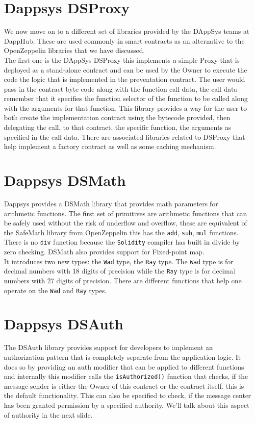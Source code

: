\section{Dappsys DSProxy}

We now move on to a different set of libraries provided by the DAppSys teams at DappHub. These are used commonly in smart contracts as an alternative to the OpenZeppelin libraries that we have discussed.\\

The first one is the DAppSys DSProxy this implements a simple Proxy that is deployed as a stand-alone contract and can be used by the Owner to execute the code the logic that is implemented in the preventation contract. The user would pass in the contract byte code along with the function call data, the call data remember that it specifies the function selector of the function to be called along with the arguments for that function. This library provides a way for the user to both create the implementation contract using the bytecode provided, then delegating the call, to that contract, the specific function, the arguments as specified in the call data. There are associated libraries related to DSProxy that help implement a factory contract as well as some caching mechanism.

\section{Dappsys DSMath}
Dappsys provides a DSMath library that provides math parameters for arithmetic functions. The first set of primitives are arithmetic functions that can be safely used without the risk of underflow and overflow, these are equivalent of the SafeMath library from OpenZeppelin this has the \verb|add|, \verb|sub|, \verb|mul| functions. There is no \verb|div| function because the \verb|Solidity| compiler has built in divide by zero checking. DSMath also provides support for Fixed-point map.\\

It introduces two new types: the \verb|Wad| type, the \verb|Ray| type. The \verb|Wad| type is for decimal numbers with 18 digits of precision while the \verb|Ray| type is for decimal numbers with 27 digits of precision. There are different functions that help one operate on the \verb|Wad| and \verb|Ray| types.

\section{Dappsys DSAuth}
The DSAuth library provides support for developers to implement an authorization pattern that is completely separate from the application logic. It does so by providing an auth modifier that can be applied to different functions and internally this modifier calls the \verb|isAuthorized()| function that checks, if the message sender is either the Owner of this contract or the contract itself. this is the default functionality. This can also be specified to check, if the message center has been granted permission by a specified authority. We'll talk about this aspect of authority in the next slide.


